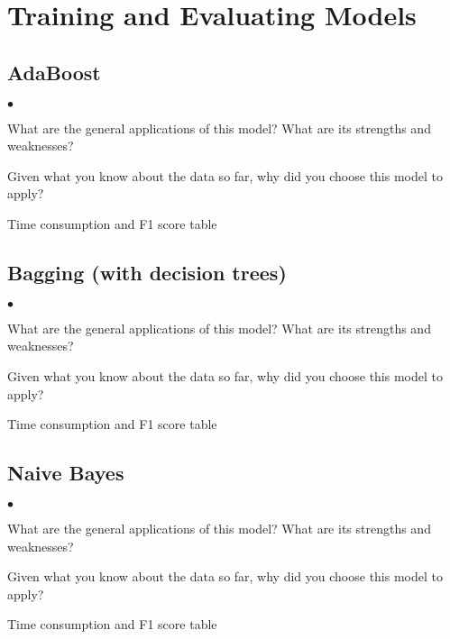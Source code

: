 \documentclass{amsart}
\begin{document}
\section{Training and Evaluating Models}
\subsection{AdaBoost}
\begin{list}{$\bullet$}{\addtolength{\parsep}{1mm}}
	\item What are the general applications of this model?  What are its strengths and weaknesses?
	\item Given what you know about the data so far, why did you choose this model to apply?
	\item Time consumption and F1 score table
\end{list}
\subsection{Bagging (with decision trees)}
\begin{list}{$\bullet$}{\addtolength{\parsep}{1mm}}
	\item What are the general applications of this model?  What are its strengths and weaknesses?
	\item Given what you know about the data so far, why did you choose this model to apply?
	\item Time consumption and F1 score table
\end{list}

\subsection{Naive Bayes}
\begin{list}{$\bullet$}{\addtolength{\parsep}{1mm}}
	\item What are the general applications of this model?  What are its strengths and weaknesses?
	\item Given what you know about the data so far, why did you choose this model to apply?
	\item Time consumption and F1 score table
\end{list}
\end{document}

